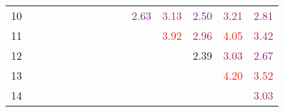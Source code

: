 \documentclass[a3paper,extrafontsizes,20pt, ngerman]{memoir}
\begin{document}
\begin{figure}
\begin{tabular}{c|cccccccccccccc}
        10                   &                                  &                                  &                                  &                                  &                                  &                                  &                                  &                                  &                                  & \textcolor[HTML]{ 81207d }{2.63} & \textcolor[HTML]{ aa2054 }{3.13} & \textcolor[HTML]{ 772087 }{2.50} & \textcolor[HTML]{ b0204e }{3.21} & \textcolor[HTML]{ 90206e }{2.81} \\
        11                   &                                  &                                  &                                  &                                  &                                  &                                  &                                  &                                  &                                  &                                  & \textcolor[HTML]{ e82016 }{3.92} & \textcolor[HTML]{ 9c2062 }{2.96} & \textcolor[HTML]{ f3200b }{4.05} & \textcolor[HTML]{ c0203e }{3.42} \\
        12                   &                                  &                                  &                                  &                                  &                                  &                                  &                                  &                                  &                                  &                                  &                                  & \textcolor[HTML]{ 6e2090 }{2.39} & \textcolor[HTML]{ a2205c }{3.03} & \textcolor[HTML]{ 852079 }{2.67} \\
        13                   &                                  &                                  &                                  &                                  &                                  &                                  &                                  &                                  &                                  &                                  &                                  &                                  & \textcolor[HTML]{ ff2000 }{4.20} & \textcolor[HTML]{ c82036 }{3.52} \\
        14                   &                                  &                                  &                                  &                                  &                                  &                                  &                                  &                                  &                                  &                                  &                                  &                                  &                                  & \textcolor[HTML]{ a2205c }{3.03} \\
    \end{tabular}


\end{figure}
\end{document}
